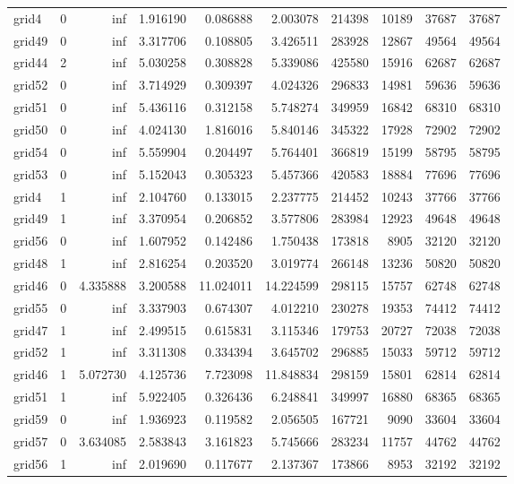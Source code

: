 \begin{longtable}{|l|r|r|r|r|r|r|r|r|r|}
grid4 & 0 & inf & 1.916190 & 0.086888 & 2.003078 & 214398 & 10189 & 37687 & 37687 \\
grid49 & 0 & inf & 3.317706 & 0.108805 & 3.426511 & 283928 & 12867 & 49564 & 49564 \\
grid44 & 2 & inf & 5.030258 & 0.308828 & 5.339086 & 425580 & 15916 & 62687 & 62687 \\
grid52 & 0 & inf & 3.714929 & 0.309397 & 4.024326 & 296833 & 14981 & 59636 & 59636 \\
grid51 & 0 & inf & 5.436116 & 0.312158 & 5.748274 & 349959 & 16842 & 68310 & 68310 \\
grid50 & 0 & inf & 4.024130 & 1.816016 & 5.840146 & 345322 & 17928 & 72902 & 72902 \\
grid54 & 0 & inf & 5.559904 & 0.204497 & 5.764401 & 366819 & 15199 & 58795 & 58795 \\
grid53 & 0 & inf & 5.152043 & 0.305323 & 5.457366 & 420583 & 18884 & 77696 & 77696 \\
grid4 & 1 & inf & 2.104760 & 0.133015 & 2.237775 & 214452 & 10243 & 37766 & 37766 \\
grid49 & 1 & inf & 3.370954 & 0.206852 & 3.577806 & 283984 & 12923 & 49648 & 49648 \\
grid56 & 0 & inf & 1.607952 & 0.142486 & 1.750438 & 173818 & 8905 & 32120 & 32120 \\
grid48 & 1 & inf & 2.816254 & 0.203520 & 3.019774 & 266148 & 13236 & 50820 & 50820 \\
grid46 & 0 & 4.335888 & 3.200588 & 11.024011 & 14.224599 & 298115 & 15757 & 62748 & 62748 \\
grid55 & 0 & inf & 3.337903 & 0.674307 & 4.012210 & 230278 & 19353 & 74412 & 74412 \\
grid47 & 1 & inf & 2.499515 & 0.615831 & 3.115346 & 179753 & 20727 & 72038 & 72038 \\
grid52 & 1 & inf & 3.311308 & 0.334394 & 3.645702 & 296885 & 15033 & 59712 & 59712 \\
grid46 & 1 & 5.072730 & 4.125736 & 7.723098 & 11.848834 & 298159 & 15801 & 62814 & 62814 \\
grid51 & 1 & inf & 5.922405 & 0.326436 & 6.248841 & 349997 & 16880 & 68365 & 68365 \\
grid59 & 0 & inf & 1.936923 & 0.119582 & 2.056505 & 167721 & 9090 & 33604 & 33604 \\
grid57 & 0 & 3.634085 & 2.583843 & 3.161823 & 5.745666 & 283234 & 11757 & 44762 & 44762 \\
grid56 & 1 & inf & 2.019690 & 0.117677 & 2.137367 & 173866 & 8953 & 32192 & 32192 \\

\end{longtable}
